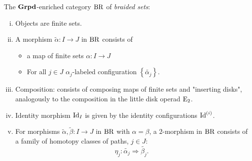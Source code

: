 
 


\begin{frame}[fragile]
    \begin{defin}
    \small{The $\operatorname{\textbf{Grpd}}$-enriched category $\operatorname{BR}$ of {\em braided sets}:
    \begin{enumerate}[(i)]
        \item Objects are finite sets.
        \item A morphism $\widetilde{\alpha} \colon I \to J$ in $\operatorname{BR}$ consists
        of 
        \begin{itemize}
            \item a map of finite sets  $\alpha \colon I \to J$
            \item For all $j \in J$ $\alpha_j$-labeled configuration
        $\left\{\widetilde{\alpha_j} \right\}$.
    
        \end{itemize}
        \item Composition: consists of composing maps of finite sets and
        "inserting disks", analogously to the composition in the little disk
        operad $\operatorname{E}_2$.

        
        \item Identity morphism $\operatorname{Id}_I$ is given by the identity configurations
        $\operatorname{Id}^{(i)}$.

        \item For morphisms $\widetilde{\alpha}, \widetilde{\beta} \colon I \to
        J$ in $\operatorname{BR}$ with $\alpha = \beta$, a
        $2$-morphism in $\operatorname{BR}$ consists of a family of homotopy classes of paths,
        $ j \in J$:
        $$
            \eta_j \colon \widetilde{\alpha_j} \Rightarrow \widetilde{\beta_j}.
        $$
    \end{enumerate}}
\end{defin}
\end{frame}

